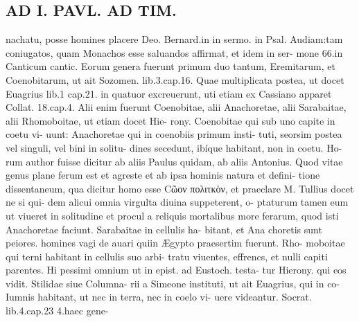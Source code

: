 \documentclass{article}
\begin{document}
\begin{pages}
\section*{AD I. PAVL. AD TIM. }
\marginpar{[ p.218 ]}nachatu, posse homines placere Deo. Bernard.in in sermo. in Psal. Audiam:tam coniugatos, quam Monachos esse saluandos affirmat, et idem in ser- mone 66.in Canticum cantic. Eorum genera fuerunt primum duo tantum, Eremitarum, et Coenobitarum, ut ait Sozomen. lib.3.cap.16. Quae multiplicata postea, ut docet Euagrius lib.1 cap.21. in quatuor excreuerunt, uti etiam ex Cassiano apparet Collat. 18.cap.4. Alii enim fuerunt Coenobitae, alii Anachoretae, alii Sarabaitae, alii Rhomoboitae, ut etiam docet Hie- rony. Coenobitae qui sub uno capite in coetu vi- uunt: Anachoretae qui in coenobiis primum insti- tuti, seorsim postea vel singuli, vel bini in solitu- dines secedunt, ibíque habitant, non in coetu. Ho- rum author fuisse dicitur ab aliis Paulus quidam, ab aliis Antonius. Quod vitae genus plane ferum est et agreste et ab ipsa hominis natura et defini- tione dissentaneum, qua dicitur homo esse Cῶον πολιτκὸν, et praeclare M. Tullius docet ne si qui- dem alicui omnia virgulta diuina suppeterent, o- ptaturum tamen eum ut viueret in solitudine et procul a reliquis mortalibus more ferarum, quod isti Anachoretae faciunt. Sarabaitae in cellulis ha- bitant, et Ana choretis sunt peiores. homines vagi de auari quiin Ægypto praesertim fuerunt. Rho- moboitae qui terni habitant in cellulis suo arbi- tratu viuentes, effrencs, et nulli capiti parentes. Hi pessimi omnium ut in epist. ad Eustoch. testa- tur Hierony. qui eos vidit. Stilidae siue Columna- rii a Simeone instituti, ut ait Euagrius, qui in co- Iumnis habitant, ut nec in terra, nec in coelo vi- uere videantur. Socrat. lib.4.cap.23 4.haec gene- 

\end{pages}
\end{document}
